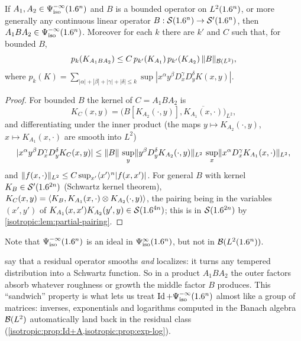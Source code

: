 \begin{lemma}\label{isotropic:lem:corner}
If $A_1,A_2\in\Psi^{-\infty}_{\mathrm{iso}}(1.6^n)$ and $B$ is a bounded operator on
$L^2(1.6^n)$, or more generally any continuous linear operator
$B:\mathcal{S}(1.6^n)\to\mathcal{S}'(1.6^n)$, then $A_1BA_2\in\Psi^{-\infty}_{\mathrm{iso}}(1.6^n)$. Moreover for
each $k$ there are $k'$ and $C$ such that, for bounded $B$,
\begin{equation}\label{isotropic:eq:corner-est}
  p_k(K_{A_1BA_2})\le C\,p_{k'}(K_{A_1})\,p_{k'}(K_{A_2})\,\lVert B\rVert_{\mathcal{B}(L^2)},
\end{equation}
where $p_k(K)=\sum_{|\alpha|+|\beta|+|\gamma|+|\delta|\le k}\sup|x^\alpha y^\beta D_x^\gamma D_y^\delta K(x,y)|$.
\end{lemma}
\begin{proof}
For bounded $B$ the kernel of $C=A_1BA_2$ is
\begin{equation*}
  K_C(x,y)=\bigl(B[K_{A_2}(\cdot,y)],\overline{K_{A_1}(x,\cdot)}\bigr)_{L^2},
\end{equation*}
and differentiating under the inner product (the maps
$y\mapsto K_{A_2}(\cdot,y)$, $x\mapsto K_{A_1}(x,\cdot)$ are smooth into $L^2$)
\begin{equation*}
  |x^\alpha y^\beta D_x^\gamma D_y^\delta K_C(x,y)|\le\lVert B\rVert\,
  \sup_y\lVert y^\beta D_y^\delta K_{A_2}(\cdot,y)\rVert_{L^2}\,\sup_x\lVert x^\alpha D_x^\gamma K_{A_1}(x,\cdot)\rVert_{L^2},
\end{equation*}
and $\lVert f(x,\cdot)\rVert_{L^2}\le C\sup_{x'}\langle x'\rangle^{n}|f(x,x')|$. For general $B$
with kernel $K_B\in\mathcal{S}'(1.6^{2n})$ (Schwartz kernel theorem),
$K_C(x,y)=\langle K_B, K_{A_1}(x,\cdot)\otimes K_{A_2}(\cdot,y)\rangle$, the pairing being in
the variables $(x',y')$ of $K_{A_1}(x,x')K_{A_2}(y',y)\in\mathcal{S}(1.6^{4n})$; this is in
$\mathcal{S}(1.6^{2n})$ by \cref{isotropic:lem:partial-pairing}.
\end{proof}

Note that $\Psi^{-\infty}_{\mathrm{iso}}(1.6^n)$ is an ideal in $\Psi^{\infty}_{\mathrm{iso}}(1.6^n)$, but
not in $\mathcal{B}(L^2(1.6^n))$.

\begin{discussion}
 say that a residual
operator smooths \emph{and} localizes: it turns any tempered distribution
into a Schwartz function. So in a product $A_1BA_2$ the outer factors absorb
whatever roughness or growth the middle factor $B$ produces. This
``sandwich'' property is what lets us treat $\operatorname{Id}+\Psi^{-\infty}_{\mathrm{iso}}(1.6^n)$
almost like a group of matrices: inverses, exponentials and logarithms
computed in the Banach algebra $\mathcal{B}(L^2)$ automatically land back in the
residual class (\cref{isotropic:prop:Id+A,isotropic:prop:exp-log}).
\end{discussion}


